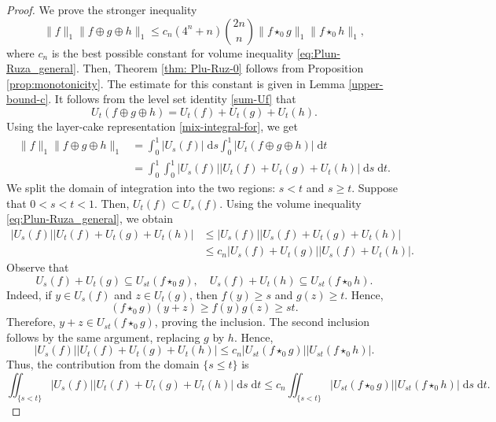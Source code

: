 \documentclass[11pt]{amsart}
\theoremstyle{plain}
\theoremstyle{definition}
\theoremstyle{remark}
\begin{document}
\begin{proof}
    We prove the stronger inequality
    \begin{equation} \label{eq:desired-ineq-thm1}
        \|f\|_1 \|f \oplus g \oplus h\|_1 \leq c_n (4^n +n) \binom{2n}{n} \|f \star_0 g \|_1\|f  \star_0 h\|_1,
    \end{equation}
    where $c_n$ is the best possible constant for volume inequality \eqref{eq:Plun-Ruza_general}.
    Then, Theorem \ref{thm: Plu-Ruz-0} follows from Proposition \ref{prop:monotonicity}.
    The estimate for this constant is given in Lemma \ref{upper-bound-c}.
    It follows from the level set identity \eqref{sum-Uf} that
    $$
        U_t (f \oplus g \oplus h) = U_t (f) + U_t (g)  + U_t (h).
    $$
    Using the layer-cake representation \eqref{mix-integral-for}, we get
    \begin{align}
        \|f\|_1 \|f \oplus g \oplus h\|_1  &= \int_0^1 |U_s (f)  | \;\mathrm ds\int_0^1 |U_t (f \oplus g \oplus h) | \;\mathrm dt
        \\
        &=
        \int_0^1 \int_0^1 |U_s (f)  | |U_t (f) + U_t (g)  + U_t (h) | \;\mathrm ds \;\mathrm dt.
    \end{align}
    We split the domain of integration into the two regions: $s <t$ and $s\geq t$.
        Suppose that $0<s< t<1$. Then, $U_t(f) \subset U_s(f)$. Using the volume inequality \eqref{eq:Plun-Ruza_general}, we obtain
        \begin{align}
            |U_s (f)  | |U_t (f) + U_t (g)  + U_t (h) |
            &\leq |U_s (f)  | |U_s (f) + U_t (g)  + U_t (h) |
            \\
            &\leq c_n |U_s (f) + U_t (g) | |U_s (f)   + U_t (h) |.
        \end{align}
        Observe that
        $$
        U_s(f)+U_t(g) \subseteq U_{s t}(f \star_0 g), \quad U_s(f)+U_t(h) \subseteq U_{s t}\left(f \star_0 h\right) .
        $$
        Indeed, if $y \in U_s(f)$ and $z \in U_t(g)$, then $f(y) \geq s$ and $g(z) \geq t$. Hence,
        $$
        \left(f \star_0 g\right)(y+z) \geq f(y) g(z) \geq s t .
        $$
        Therefore, $y+z \in U_{s t}\left(f \star_0 g\right)$, proving the inclusion. The second inclusion follows by the same argument, replacing $g$ by $h$.
        Hence,
        \[
            |U_s (f)  | |U_t (f) + U_t (g)  + U_t (h) |  \leq c_n |U_{s t}(f \star_0 g) | | U_{s t}(f \star_0 h)|.
        \]
        Thus, the contribution from the domain $\{s \leq t\}$ is
        \[
            \iint_{\{s< t\}} |U_s (f)  | |U_t (f) + U_t (g)  + U_t (h) | \;\mathrm ds \;\mathrm dt \leq c_n \iint_{\{s< t\}}  |U_{s t}(f \star_0 g) | | U_{s t}(f \star_0 h)| \;\mathrm ds \;\mathrm dt.
\]
\end{proof}
\end{document}
